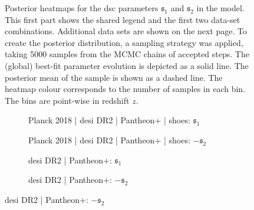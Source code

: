 \begin{figure}[p]
    \tagstructend
    \caption[Posterior heatmaps for dSC parameters (part I).]{Posterior heatmaps for the \gls{dsc} parameters $\mathfrak{s}_1$ and $\mathfrak{s}_2$ in the  model. This first part shows the shared legend and the first two data-set combinations. Additional data sets are shown on the next page. To create the posterior distribution, a sampling strategy was applied, taking 5000 samples from the MCMC chains of accepted steps. The (global) best-fit parameter evolution is depicted as a solid line. The posterior mean of the sample is shown as a dashed line. The heatmap colour corresponds to the number of samples in each bin. The bins are point-wise in redshift $z$.}
    \label{fig:HyperbolicdSCHeatmap}
\end{figure}

\begin{figure}[p]
    \centering
    \ContinuedFloat

    \begin{subfigure}[t]{0.49\textwidth}
        \centering
        \caption{Planck 2018 | \gls{desi} DR2 | Pantheon+ | \gls{shoes}: $\mathfrak{s}_1$}
        \label{fig:HyperbolicdSCHeatmap:PlanckPPSDESIS1}
    \end{subfigure}
    \hfill
    \begin{subfigure}[t]{0.49\textwidth}
        \centering
        \caption{Planck 2018 | \gls{desi} DR2 | Pantheon+ | \gls{shoes}: $-\mathfrak{s}_2$}
        \label{fig:HyperbolicdSCHeatmap:PlanckPPSDESIS2}
    \end{subfigure}

    \vspace{0.35em}

    \begin{subfigure}[t]{0.49\textwidth}
        \centering
        \caption{\gls{desi} DR2 | Pantheon+: $\mathfrak{s}_1$}
        \label{fig:HyperbolicdSCHeatmap:PPDS1}
    \end{subfigure}
    \hfill
    \begin{subfigure}[t]{0.49\textwidth}
        \centering
        \caption{\gls{desi} DR2 | Pantheon+: $-\mathfrak{s}_2$}
        \label{fig:HyperbolicdSCHeatmap:PPDS2}
    \end{subfigure}


\end{figure}
